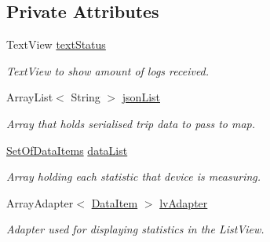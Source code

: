 \subsection*{Private Attributes}
\begin{DoxyCompactItemize}
\item 
\mbox{\label{class_android_app_1_1_realtime_fragment_a8aa6530bcc9c6ef17627f1395ff7910d}} 
Text\+View \hyperlink{class_android_app_1_1_realtime_fragment_a8aa6530bcc9c6ef17627f1395ff7910d}{text\+Status}
\begin{DoxyCompactList}\small\item\em Text\+View to show amount of logs received. \end{DoxyCompactList}\item 
\mbox{\label{class_android_app_1_1_realtime_fragment_a4c3f12bcaaab715dc512d4cd4a4c11cf}} 
Array\+List$<$ String $>$ \hyperlink{class_android_app_1_1_realtime_fragment_a4c3f12bcaaab715dc512d4cd4a4c11cf}{json\+List}
\begin{DoxyCompactList}\small\item\em Array that holds serialised trip data to pass to map. \end{DoxyCompactList}\item 
\mbox{\label{class_android_app_1_1_realtime_fragment_ab1c4983b61e50b501ed22842253bf849}} 
\hyperlink{class_android_app_1_1_set_of_data_items}{Set\+Of\+Data\+Items} \hyperlink{class_android_app_1_1_realtime_fragment_ab1c4983b61e50b501ed22842253bf849}{data\+List}
\begin{DoxyCompactList}\small\item\em Array holding each statistic that device is measuring. \end{DoxyCompactList}\item 
\mbox{\label{class_android_app_1_1_realtime_fragment_afeafb95e85d8ba0b9c50aa36af2f4216}} 
Array\+Adapter$<$ \hyperlink{class_android_app_1_1_data_item}{Data\+Item} $>$ \hyperlink{class_android_app_1_1_realtime_fragment_afeafb95e85d8ba0b9c50aa36af2f4216}{lv\+Adapter}
\begin{DoxyCompactList}\small\item\em Adapter used for displaying statistics in the List\+View. \end{DoxyCompactList}\end{DoxyCompactItemize}
